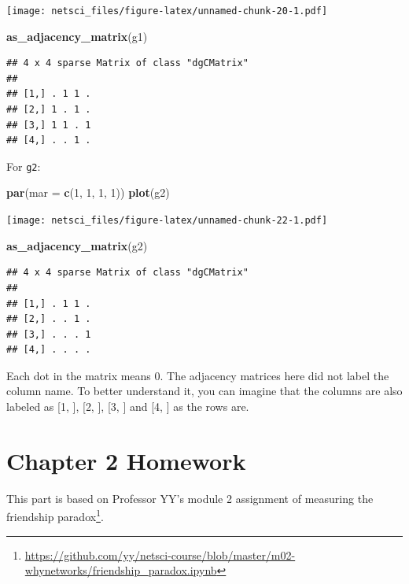 \documentclass[
]{krantz}
\makeatletter
\newenvironment{Shaded}{\begin{snugshade}}{\end{snugshade}}
\newcommand{\DataTypeTok}[1]{\textcolor[rgb]{0.27,0.27,0.27}{#1}}
\newcommand{\DecValTok}[1]{\textcolor[rgb]{0.06,0.06,0.06}{#1}}
\newcommand{\KeywordTok}[1]{\textcolor[rgb]{0.27,0.27,0.27}{\textbf{#1}}}
\newcommand{\NormalTok}[1]{#1}
\renewcommand{\href}[2]{#2\footnote{\url{#1}}}
\newenvironment{kframe}{%
\medskip{}
\setlength{\fboxsep}{.8em}
 \def\at@end@of@kframe{}%
 \ifinner\ifhmode%
  \def\at@end@of@kframe{\end{minipage}}%
  \begin{minipage}{\columnwidth}%
 \fi\fi%
 \def\FrameCommand##1{\hskip\@totalleftmargin \hskip-\fboxsep
 \colorbox{shadecolor}{##1}\hskip-\fboxsep
     \hskip-\linewidth \hskip-\@totalleftmargin \hskip\columnwidth}%
 \MakeFramed {\advance\hsize-\width
   \@totalleftmargin\z@ \linewidth\hsize
   \@setminipage}}%
 {\par\unskip\endMakeFramed%
 \at@end@of@kframe}
\renewenvironment{Shaded}{\begin{kframe}}{\end{kframe}}
\newenvironment{rmdblock}[1]
  {
  \begin{itemize}
  \renewcommand{\labelitemi}{
    \raisebox{-.7\height}[0pt][0pt]{
      {\setkeys{Gin}{width=3em,keepaspectratio}\texttt{[image: images/\#1]}}
    }
  }
  \setlength{\fboxsep}{1em}
  \begin{kframe}
  \item
  }
  {
  \end{kframe}
  \end{itemize}
  }
\newenvironment{rmdnote}
  {\begin{rmdblock}{note}}
  {\end{rmdblock}}
\makeatother
\begin{document}
\texttt{[image: netsci\_files/figure-latex/unnamed-chunk-20-1.pdf]}

\begin{Shaded}
\begin{Highlighting}[]
\KeywordTok{as_adjacency_matrix}\NormalTok{(g1)}
\end{Highlighting}
\end{Shaded}

\begin{verbatim}
## 4 x 4 sparse Matrix of class "dgCMatrix"
##             
## [1,] . 1 1 .
## [2,] 1 . 1 .
## [3,] 1 1 . 1
## [4,] . . 1 .
\end{verbatim}

For \texttt{g2}:

\begin{Shaded}
\begin{Highlighting}[]
\KeywordTok{par}\NormalTok{(}\DataTypeTok{mar =} \KeywordTok{c}\NormalTok{(}\DecValTok{1}\NormalTok{, }\DecValTok{1}\NormalTok{, }\DecValTok{1}\NormalTok{, }\DecValTok{1}\NormalTok{))}
\KeywordTok{plot}\NormalTok{(g2)}
\end{Highlighting}
\end{Shaded}

\texttt{[image: netsci\_files/figure-latex/unnamed-chunk-22-1.pdf]}

\begin{Shaded}
\begin{Highlighting}[]
\KeywordTok{as_adjacency_matrix}\NormalTok{(g2)}
\end{Highlighting}
\end{Shaded}

\begin{verbatim}
## 4 x 4 sparse Matrix of class "dgCMatrix"
##             
## [1,] . 1 1 .
## [2,] . . 1 .
## [3,] . . . 1
## [4,] . . . .
\end{verbatim}

Each dot in the matrix means \(0\). The adjacency matrices here did not label the column name. To better understand it, you can imagine that the columns are also labeled as {[}1, {]}, {[}2, {]}, {[}3, {]} and {[}4, {]} as the rows are.

\hypertarget{chapter-2-homework}{%
\section{Chapter 2 Homework}\label{chapter-2-homework}}

\begin{rmdnote}
This part is based on Professor YY's module 2 assignment of \href{https://github.com/yy/netsci-course/blob/master/m02-whynetworks/friendship_paradox.ipynb}{measuring the friendship paradox}.
\end{rmdnote}
\end{document}
